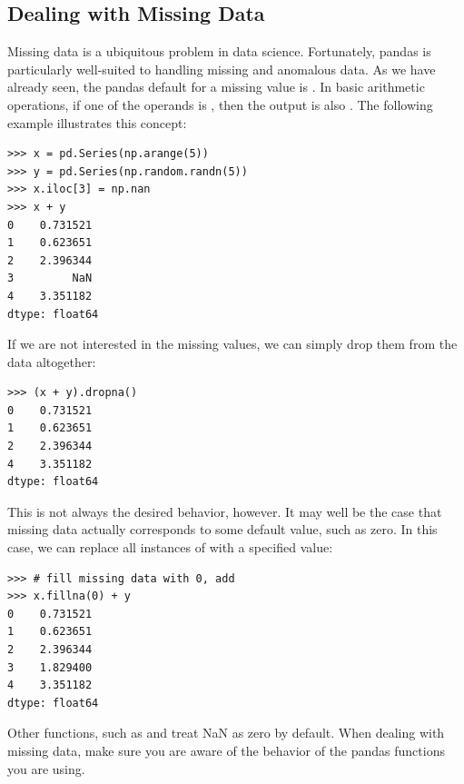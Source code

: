 \subsection*{Dealing with Missing Data}
Missing data is a ubiquitous problem in data science. Fortunately, pandas is particularly well-suited to 
handling missing and anomalous data. As we have already seen, the pandas default for a missing value is . 
In basic arithmetic operations, if one of the operands is , then the output is also .
The following example illustrates this concept:
\begin{lstlisting}
>>> x = pd.Series(np.arange(5))
>>> y = pd.Series(np.random.randn(5))
>>> x.iloc[3] = np.nan
>>> x + y
0    0.731521
1    0.623651
2    2.396344
3         NaN
4    3.351182
dtype: float64
\end{lstlisting}
If we are not interested in the missing values, we can simply drop them from the data altogether:
\begin{lstlisting}
>>> (x + y).dropna()
0    0.731521
1    0.623651
2    2.396344
4    3.351182
dtype: float64
\end{lstlisting}

This is not always the desired behavior, however. It may well be the case that missing data actually corresponds to
some default value, such as zero. In this case, we can replace all instances of  with a specified value:
\begin{lstlisting}
>>> # fill missing data with 0, add
>>> x.fillna(0) + y
0    0.731521
1    0.623651
2    2.396344
3    1.829400
4    3.351182
dtype: float64
\end{lstlisting}

Other functions, such as  and  treat NaN as zero by default.
When dealing with missing data, make sure you are aware of the behavior of the pandas
functions you are using.

